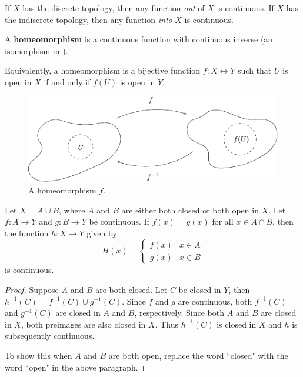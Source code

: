 \documentclass[twoside,10pt]{report}
\begin{document}
\begin{ex}[]
	If $X$ has the discrete topology, then any function \textit{out} of $X$ is continuous. If $X$ has the indiscrete topology, then any function \textit{into} $X$ is continuous.
\end{ex}

\begin{defn}
	A \textbf{homeomorphism} is a continuous function with continuous inverse (an isomorphism in ).

	Equivalently, a homeomorphism is a bijective function $f: X \leftrightarrow Y$ such that $U$ is open in $X$ if and only if $f(U)$ is open in $Y$.
\end{defn}

\begin{figure}[H]
	\centering
	\includegraphics[scale=1.3]{fig/homeomorphism.pdf}
	\caption{A homeomorphism $f$.}
\end{figure}

\begin{thrm}
	Let $X = A \cup B$, where $A$ and $B$ are either both closed or both open in $X$. Let $f:A \to Y$ and $g:B\to Y$ be continuous. If $f(x)=g(x)$ for all $x \in A \cap B$, then the function $h : X \to Y$ given by
	\[
		H(x)=
		\begin{cases}
			f(x) & x \in A \\
			g(x) & x\in B
		\end{cases}
	\] is continuous.
\end{thrm}
\begin{proof}
	Suppose $A$ and $B$ are both closed. Let $C$ be closed in $Y$, then $h^{-1}(C) = f^{-1}(C) \cup g^{-1}(C)$. Since $f$ and $g$ are continuous, both $f^{-1}(C)$ and $g^{-1}(C)$ are closed in $A$ and $B$, respectively. Since both $A$ and $B$ are closed in $X$, both preimages are also closed in $X$. Thus $h^{-1}(C)$ is closed in $X$ and $h$ is subsequently continuous.

	To show this when $A$ and $B$ are both open, replace the word ``closed" with the word ``open" in the above paragraph.
\end{proof}
\end{document}

